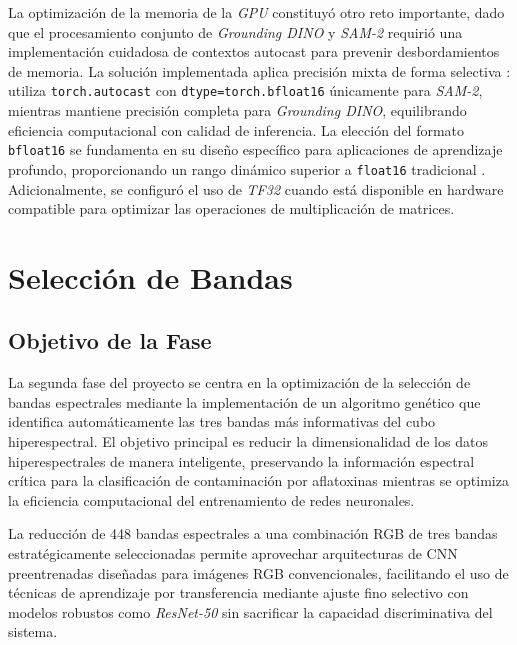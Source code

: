 \vspace{5mm}

La optimización de la memoria de la \emph{GPU} constituyó otro reto importante, dado que el procesamiento conjunto de \emph{Grounding DINO} y \emph{SAM-2} requirió una implementación cuidadosa de contextos autocast para prevenir desbordamientos de memoria. La solución implementada aplica precisión mixta de forma selectiva \cite{micikevicius2018mixedprecisiontraining}: utiliza \texttt{torch.autocast} con \texttt{dtype=torch.bfloat16} únicamente para \emph{SAM-2}, mientras mantiene precisión completa para \emph{Grounding DINO}, equilibrando eficiencia computacional con calidad de inferencia. La elección del formato \texttt{bfloat16} se fundamenta en su diseño específico para aplicaciones de aprendizaje profundo, proporcionando un rango dinámico superior a \texttt{float16} tradicional \cite{8877411}. Adicionalmente, se configuró el uso de \emph{TF32} cuando está disponible en hardware compatible para optimizar las operaciones de multiplicación de matrices.

\section{Selección de Bandas}

\subsection{Objetivo de la Fase}
La segunda fase del proyecto se centra en la optimización de la selección de bandas espectrales mediante la implementación de un algoritmo genético que identifica automáticamente las tres bandas más informativas del cubo hiperespectral. El objetivo principal es reducir la dimensionalidad de los datos hiperespectrales de manera inteligente, preservando la información espectral crítica para la clasificación de contaminación por aflatoxinas mientras se optimiza la eficiencia computacional del entrenamiento de redes neuronales.

\vspace{5mm}

La reducción de 448 bandas espectrales a una combinación RGB de tres bandas estratégicamente seleccionadas permite aprovechar arquitecturas de CNN preentrenadas diseñadas para imágenes RGB convencionales, facilitando el uso de técnicas de aprendizaje por transferencia mediante ajuste fino selectivo \cite{NEURIPS2019_9015} con modelos robustos como \emph{ResNet-50} \cite{he2016deep} sin sacrificar la capacidad discriminativa del sistema.

